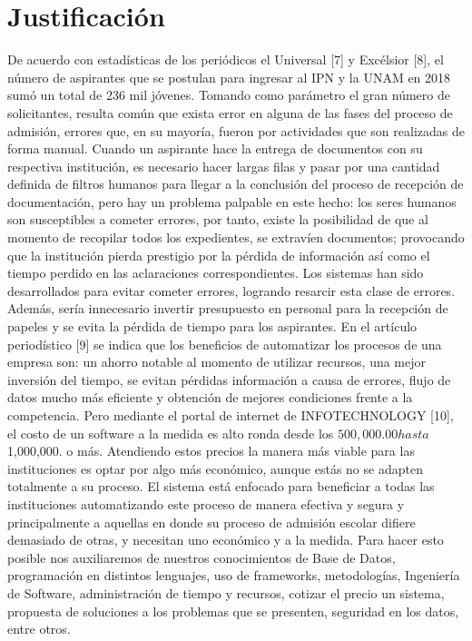 \section{Justificación}

    De acuerdo con estadísticas de los periódicos el Universal [7] y Excélsior [8], el número de aspirantes que se postulan para ingresar al IPN y la UNAM en 2018 sumó un total de  236 mil jóvenes. Tomando como parámetro el gran número de solicitantes, resulta común que exista error en alguna de las fases del proceso de admisión, errores que, en su mayoría, fueron por actividades que son realizadas de forma manual. 
    Cuando un aspirante hace la entrega de documentos con su respectiva institución, es necesario hacer largas filas y  pasar por una cantidad definida de filtros humanos para llegar a la conclusión del proceso de recepción de documentación, pero hay un problema palpable en este hecho: los seres humanos son susceptibles a cometer errores, por tanto, existe la posibilidad de que al momento de recopilar todos los expedientes, se extravíen documentos; provocando que la institución pierda prestigio por la pérdida de información así como el tiempo perdido en las aclaraciones correspondientes. Los sistemas han sido desarrollados para evitar cometer errores, logrando resarcir esta clase de errores. Además,  sería innecesario invertir presupuesto en personal para la recepción de papeles y se evita la pérdida de tiempo para los aspirantes. En el artículo periodístico [9] se indica que los beneficios de automatizar los procesos de una empresa son: un ahorro notable al momento de utilizar recursos, una mejor inversión del tiempo, se evitan pérdidas información a causa de errores, flujo de datos mucho más eficiente y obtención de  mejores condiciones frente a la competencia.
    Pero mediante el portal de internet de INFOTECHNOLOGY [10], el costo de un software a la medida es alto ronda desde los $500,000.00 hasta $1,000,000. o más. Atendiendo estos precios la manera más viable para las instituciones es optar por algo más económico, aunque estás no se adapten totalmente a su proceso.  
    El sistema está enfocado para beneficiar a todas las instituciones automatizando este proceso de manera efectiva y segura y principalmente a aquellas en donde su proceso de admisión escolar difiere demasiado de otras, y necesitan uno económico y a la medida.
    Para hacer esto posible nos auxiliaremos de nuestros conocimientos de Base de Datos, programación en distintos lenguajes, uso de frameworks, metodologías, Ingeniería de Software, administración de tiempo y recursos, cotizar el precio un sistema, propuesta de soluciones a los problemas que se presenten, seguridad en los datos, entre otros. 

